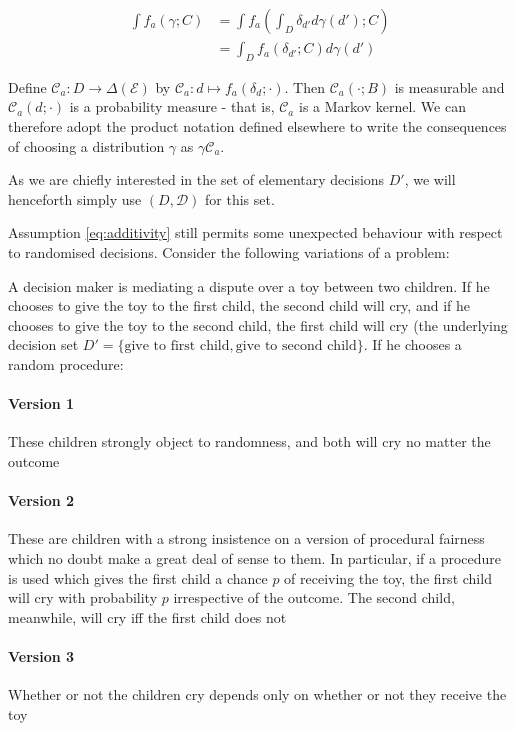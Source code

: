 \begin{align}
	\int f_a(\gamma ;C) &= \int f_a(\int_D \delta_{d'}d\gamma(d') ;C)\\
											   &=\int_D f_a(\delta_{d'};C) d\gamma(d')
\end{align}

Define $\mathscr{C}_a:D\to \Delta(\mathcal{E})$ by $\mathscr{C}_a:d\mapsto f_a(\delta_{d};\cdot)$. Then $\mathscr{C}_a(\cdot;B)$ is measurable and $\mathscr{C}_a(d;\cdot)$ is a probability measure - that is, $\mathscr{C}_a$ is a Markov kernel. We can therefore adopt the product notation defined elsewhere to write the consequences of choosing a distribution $\gamma$ as $\gamma \mathscr{C}_a$.


As we are chiefly interested in the set of elementary decisions $D'$, we will henceforth simply use $(D,\mathcal{D})$ for this set.

Assumption \ref{eq:additivity} still permits some unexpected behaviour with respect to randomised decisions. Consider the following variations of a problem:

\begin{example}
A decision maker is mediating a dispute over a toy between two children. If he chooses to give the toy to the first child, the second child will cry, and if he chooses to give the toy to the second child, the first child will cry (the underlying decision set $D'=\{\text{give to first child}, \text{give to second child}\}$. If he chooses a random procedure:

\paragraph{Version 1} These children strongly object to randomness, and both will cry no matter the outcome
\paragraph{Version 2} These are children with a strong insistence on a version of procedural fairness which no doubt make a great deal of sense to them. In particular, if a procedure is used which gives the first child a chance $p$ of receiving the toy, the first child will cry with probability $p$ irrespective of the outcome. The second child, meanwhile, will cry iff the first child does not
\paragraph{Version 3} Whether or not the children cry depends only on whether or not they receive the toy
\end{example}

